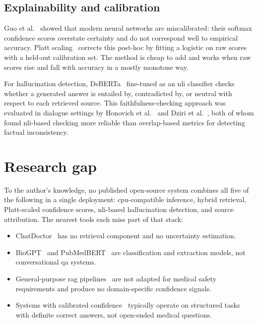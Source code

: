 \subsection{Explainability and calibration}

Guo et al.~\cite{guo2017calibration} showed that modern neural networks are miscalibrated: their softmax confidence scores overstate certainty and do not correspond well to empirical accuracy. Platt scaling~\cite{platt1999probabilistic} corrects this post-hoc by fitting a logistic on raw scores with a held-out calibration set. The method is cheap to add and works when raw scores rise and fall with accuracy in a mostly monotone way.

For hallucination detection, DeBERTa~\cite{he2021deberta} fine-tuned as an \ac{nli} classifier checks whether a generated answer is entailed by, contradicted by, or neutral with respect to each retrieved source. This faithfulness-checking approach was evaluated in dialogue settings by Honovich et al.~\cite{honovich2022true} and Dziri et al.~\cite{dziri2022faithdial}, both of whom found \ac{nli}-based checking more reliable than overlap-based metrics for detecting factual inconsistency.

\section{Research gap}

To the author's knowledge, no published open-source system combines all five of the following in a single deployment: \ac{cpu}-compatible inference, hybrid retrieval, Platt-scaled confidence scores, \ac{nli}-based hallucination detection, and source attribution. The nearest tools each miss part of that stack:

\begin{itemize}
    \item ChatDoctor~\cite{li2023chatdoctor} has no retrieval component and no uncertainty estimation.
    \item BioGPT~\cite{luo2022biogpt} and PubMedBERT~\cite{gu2021pubmedbert} are classification and extraction models, not conversational \ac{qa} systems.
    \item General-purpose \ac{rag} pipelines~\cite{lewis2020rag} are not adapted for medical safety requirements and produce no domain-specific confidence signals.
    \item Systems with calibrated confidence~\cite{guo2017calibration} typically operate on structured tasks with definite correct answers, not open-ended medical questions.
\end{itemize}


